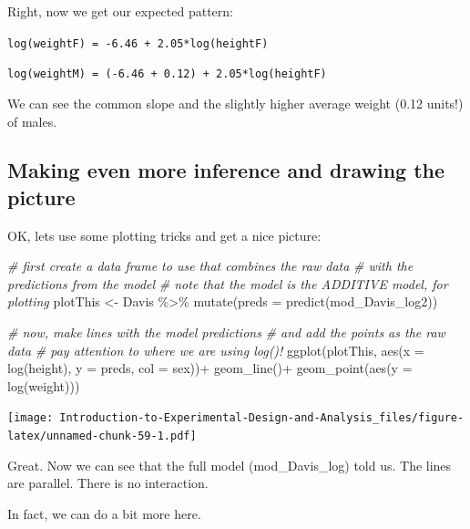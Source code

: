 \documentclass[
]{book}
\newenvironment{Shaded}{\begin{snugshade}}{\end{snugshade}}
\newcommand{\AttributeTok}[1]{\textcolor[rgb]{0.77,0.63,0.00}{#1}}
\newcommand{\CommentTok}[1]{\textcolor[rgb]{0.56,0.35,0.01}{\textit{#1}}}
\newcommand{\FunctionTok}[1]{\textcolor[rgb]{0.00,0.00,0.00}{#1}}
\newcommand{\NormalTok}[1]{#1}
\newcommand{\OtherTok}[1]{\textcolor[rgb]{0.56,0.35,0.01}{#1}}
\newcommand{\SpecialCharTok}[1]{\textcolor[rgb]{0.00,0.00,0.00}{#1}}
\begin{document}
Right, now we get our expected pattern:

\texttt{log(weightF)\ =\ -6.46\ +\ 2.05*log(heightF)}

\texttt{log(weightM)\ =\ (-6.46\ +\ 0.12)\ +\ 2.05*log(heightF)}

We can see the common slope and the slightly higher average weight (0.12 units!) of males.

\hypertarget{making-even-more-inference-and-drawing-the-picture}{%
\subsection{Making even more inference and drawing the picture}\label{making-even-more-inference-and-drawing-the-picture}}

OK, lets use some plotting tricks and get a nice picture:

\begin{Shaded}
\begin{Highlighting}[]
\CommentTok{\# first create a data frame to use that combines the raw data }
\CommentTok{\# with the predictions from the model}
\CommentTok{\# note that the model is the ADDITIVE model, for plotting}
\NormalTok{plotThis }\OtherTok{\textless{}{-}}\NormalTok{ Davis }\SpecialCharTok{\%\textgreater{}\%} 
  \FunctionTok{mutate}\NormalTok{(}\AttributeTok{preds =} \FunctionTok{predict}\NormalTok{(mod\_Davis\_log2))}

\CommentTok{\# now, make lines with the model predictions}
\CommentTok{\# and add the points as the raw data}
\CommentTok{\# pay attention to where we are using log()!}
\FunctionTok{ggplot}\NormalTok{(plotThis, }\FunctionTok{aes}\NormalTok{(}\AttributeTok{x =} \FunctionTok{log}\NormalTok{(height), }\AttributeTok{y =}\NormalTok{ preds, }\AttributeTok{col =}\NormalTok{ sex))}\SpecialCharTok{+}
  \FunctionTok{geom\_line}\NormalTok{()}\SpecialCharTok{+}
  \FunctionTok{geom\_point}\NormalTok{(}\FunctionTok{aes}\NormalTok{(}\AttributeTok{y =} \FunctionTok{log}\NormalTok{(weight)))}
\end{Highlighting}
\end{Shaded}

\texttt{[image: Introduction-to-Experimental-Design-and-Analysis\_files/figure-latex/unnamed-chunk-59-1.pdf]}

Great. Now we can see that the full model (mod\_Davis\_log) told us. The lines are parallel. There is no interaction.

In fact, we can do a bit more here.
\end{document}
